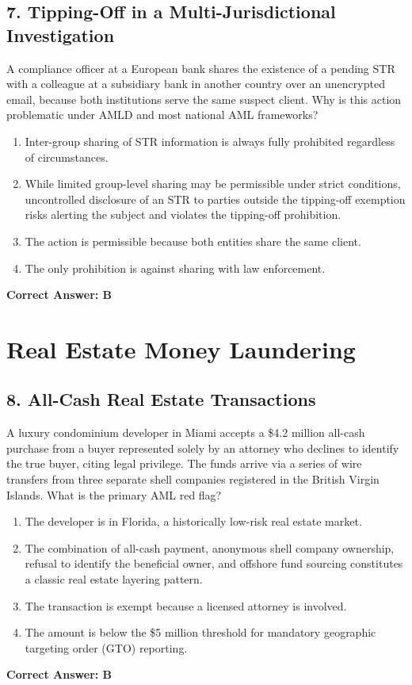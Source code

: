 \documentclass[11pt,a4paper]{article}
\begin{document}
	\subsection{7. Tipping-Off in a Multi-Jurisdictional Investigation}
	A compliance officer at a European bank shares the existence of a pending STR with a colleague at a subsidiary bank in another country over an unencrypted email, because both institutions serve the same suspect client. Why is this action problematic under AMLD and most national AML frameworks?
	\begin{enumerate}[label=\Alph*.]
		\item Inter-group sharing of STR information is always fully prohibited regardless of circumstances.
		\item While limited group-level sharing may be permissible under strict conditions, uncontrolled disclosure of an STR to parties outside the tipping-off exemption risks alerting the subject and violates the tipping-off prohibition.
		\item The action is permissible because both entities share the same client.
		\item The only prohibition is against sharing with law enforcement.
	\end{enumerate}
	\textbf{Correct Answer: B}
	
	\section{Real Estate Money Laundering}
	
	\subsection{8. All-Cash Real Estate Transactions}
	A luxury condominium developer in Miami accepts a \$4.2 million all-cash purchase from a buyer represented solely by an attorney who declines to identify the true buyer, citing legal privilege. The funds arrive via a series of wire transfers from three separate shell companies registered in the British Virgin Islands. What is the primary AML red flag?
	\begin{enumerate}[label=\Alph*.]
		\item The developer is in Florida, a historically low-risk real estate market.
		\item The combination of all-cash payment, anonymous shell company ownership, refusal to identify the beneficial owner, and offshore fund sourcing constitutes a classic real estate layering pattern.
		\item The transaction is exempt because a licensed attorney is involved.
		\item The amount is below the \$5 million threshold for mandatory geographic targeting order (GTO) reporting.
	\end{enumerate}
	\textbf{Correct Answer: B}
	
\end{document}
